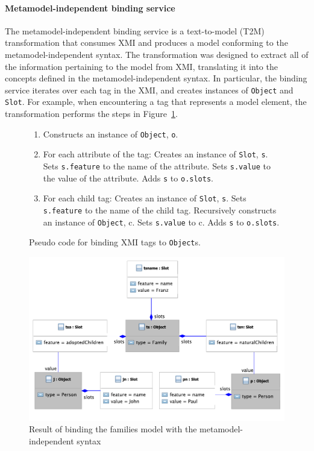 \paragraph{Metamodel-independent binding service} The metamodel-independent binding service is a text-to-model (T2M) transformation that consumes XMI and produces a model conforming to the metamodel-independent syntax. The transformation was designed to extract all of the information pertaining to the model from XMI, translating it into the concepts defined in the metamodel-independent syntax. In particular, the binding service iterates over each tag in the XMI, and creates instances of \texttt{Ob\-je\-ct} and \texttt{Sl\-ot}. For example, when encountering a tag that represents a model element, the transformation performs the steps in Figure~\ref{fig:binding_objects}.

\begin{figure}[p]
	\begin{framed}
		\begin{enumerate}
			\item Constructs an instance of \texttt{Ob\-je\-ct}, \texttt{o}.
			\item For each attribute of the tag:
			\subitem Creates an instance of \texttt{Sl\-ot}, \texttt{s}.
			\subitem Sets \texttt{s.feature} to the name of the attribute.
			\subitem Sets \texttt{s.value} to the value of the attribute.
			\subitem Adds \texttt{s} to \texttt{o.slots}.
			\item For each child tag:
			\subitem Creates an instance of \texttt{Sl\-ot}, \texttt{s}.
			\subitem Sets \texttt{s.feature} to the name of the child tag.
			\subitem Recursively constructs an instance of \texttt{Ob\-je\-ct}, c.
			\subitem Sets \texttt{s.value} to c.
			\subitem Adds \texttt{s} to \texttt{o.slots}.
		\end{enumerate}
	\end{framed}
	\caption{Pseudo code for binding XMI tags to \texttt{Ob\-je\-ct}s.}
  \label{fig:binding_objects}
\end{figure}

\begin{figure}[p]
  \centering
  \includegraphics[width=12cm]{5.Implementation/images/generic_binding.pdf}
  \caption[Metamodel-independent binding of the families metamodel]{Result of binding the families model with the metamodel-independent syntax}
  \label{fig:generic_binding}
\end{figure}


